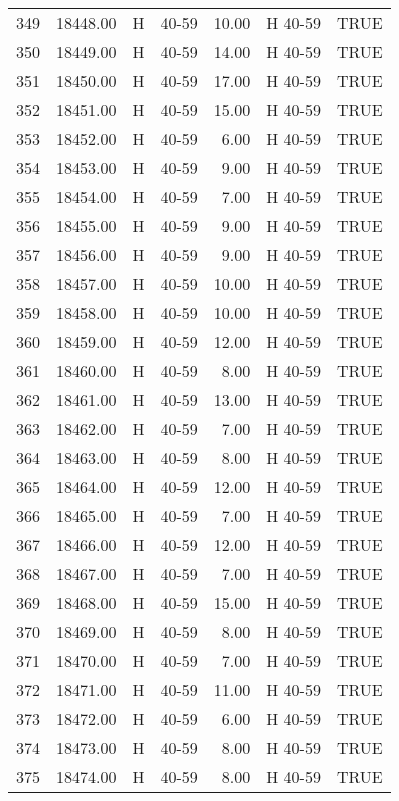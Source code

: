 \begin{table}[ht]
\begin{tabular}{rrllrll}
  349 & 18448.00 & H & 40-59 & 10.00 & H 40-59 & TRUE \\ 
  350 & 18449.00 & H & 40-59 & 14.00 & H 40-59 & TRUE \\ 
  351 & 18450.00 & H & 40-59 & 17.00 & H 40-59 & TRUE \\ 
  352 & 18451.00 & H & 40-59 & 15.00 & H 40-59 & TRUE \\ 
  353 & 18452.00 & H & 40-59 & 6.00 & H 40-59 & TRUE \\ 
  354 & 18453.00 & H & 40-59 & 9.00 & H 40-59 & TRUE \\ 
  355 & 18454.00 & H & 40-59 & 7.00 & H 40-59 & TRUE \\ 
  356 & 18455.00 & H & 40-59 & 9.00 & H 40-59 & TRUE \\ 
  357 & 18456.00 & H & 40-59 & 9.00 & H 40-59 & TRUE \\ 
  358 & 18457.00 & H & 40-59 & 10.00 & H 40-59 & TRUE \\ 
  359 & 18458.00 & H & 40-59 & 10.00 & H 40-59 & TRUE \\ 
  360 & 18459.00 & H & 40-59 & 12.00 & H 40-59 & TRUE \\ 
  361 & 18460.00 & H & 40-59 & 8.00 & H 40-59 & TRUE \\ 
  362 & 18461.00 & H & 40-59 & 13.00 & H 40-59 & TRUE \\ 
  363 & 18462.00 & H & 40-59 & 7.00 & H 40-59 & TRUE \\ 
  364 & 18463.00 & H & 40-59 & 8.00 & H 40-59 & TRUE \\ 
  365 & 18464.00 & H & 40-59 & 12.00 & H 40-59 & TRUE \\ 
  366 & 18465.00 & H & 40-59 & 7.00 & H 40-59 & TRUE \\ 
  367 & 18466.00 & H & 40-59 & 12.00 & H 40-59 & TRUE \\ 
  368 & 18467.00 & H & 40-59 & 7.00 & H 40-59 & TRUE \\ 
  369 & 18468.00 & H & 40-59 & 15.00 & H 40-59 & TRUE \\ 
  370 & 18469.00 & H & 40-59 & 8.00 & H 40-59 & TRUE \\ 
  371 & 18470.00 & H & 40-59 & 7.00 & H 40-59 & TRUE \\ 
  372 & 18471.00 & H & 40-59 & 11.00 & H 40-59 & TRUE \\ 
  373 & 18472.00 & H & 40-59 & 6.00 & H 40-59 & TRUE \\ 
  374 & 18473.00 & H & 40-59 & 8.00 & H 40-59 & TRUE \\ 
  375 & 18474.00 & H & 40-59 & 8.00 & H 40-59 & TRUE \\ 

\end{tabular}
\end{table}
